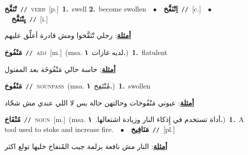 \documentclass[10pt,a4paper,twoside]{article} %
\begin{document}
\begin{multicols}{2}
{\setlength\topsep{0pt}\textbf{\foreignlanguage{arabic}{تْنَفَّخ}}\ {\color{gray}\texttt{//}\color{black}}\ \textsc{verb}\ [p.]\ \textbf{1.}~swell  \textbf{2.}~become swollen\ \ $\bullet$\ \ \setlength\topsep{0pt}\textbf{\foreignlanguage{arabic}{اِتْنَفَّخ}}\ {\color{gray}\texttt{//}\color{black}}\ [c.]\ \ $\bullet$\ \ \setlength\topsep{0pt}\textbf{\foreignlanguage{arabic}{يِتْنَفَّخ}}\ {\color{gray}\texttt{//}\color{black}}\ [i.]\  \begin{flushright}\color{gray}\foreignlanguage{arabic}{\textbf{\underline{\foreignlanguage{arabic}{أمثلة}}}: رجلي تْنَفَّخوا ومش قادرة أعلِّق عليهم}\end{flushright}\color{black}} \vspace{2mm}

{\setlength\topsep{0pt}\textbf{\foreignlanguage{arabic}{مَنْفُوخ}}\ {\color{gray}\texttt{//}\color{black}}\ \textsc{adj}\ [m.]\ \color{gray}(msa. \foreignlanguage{arabic}{لديه غازات}~\foreignlanguage{arabic}{\textbf{١.}})\color{black}\ \textbf{1.}~flatulent\  \begin{flushright}\color{gray}\foreignlanguage{arabic}{\textbf{\underline{\foreignlanguage{arabic}{أمثلة}}}: حاسة حالي مَنْفُوخَة بعد المفتول}\end{flushright}\color{black}} \vspace{2mm}

{\setlength\topsep{0pt}\textbf{\foreignlanguage{arabic}{مَنْفُوخ}}\ {\color{gray}\texttt{//}\color{black}}\ \textsc{noun\textunderscore pass}\ \color{gray}(msa. \foreignlanguage{arabic}{مُنْتَفِخ}~\foreignlanguage{arabic}{\textbf{١.}})\color{black}\ \textbf{1.}~swollen\  \begin{flushright}\color{gray}\foreignlanguage{arabic}{\textbf{\underline{\foreignlanguage{arabic}{أمثلة}}}: عيوني مَنْفُوخات وحالتهن حالة بس لا اللي عندي مش شحّاد}\end{flushright}\color{black}} \vspace{2mm}

{\setlength\topsep{0pt}\textbf{\foreignlanguage{arabic}{مُنْفَاخ}}\ {\color{gray}\texttt{//}\color{black}}\ \textsc{noun}\ [m.]\ \color{gray}(msa. \foreignlanguage{arabic}{أداة تستخدم في إِذكاء النار وزيادة اشتعالها.}~\foreignlanguage{arabic}{\textbf{١.}})\color{black}\ \textbf{1.}~A tool used to stoke and increase fire.\ \ $\bullet$\ \ \setlength\topsep{0pt}\textbf{\foreignlanguage{arabic}{مَنَافِيخ}}\ {\color{gray}\texttt{//}\color{black}}\ [pl.]\  \begin{flushright}\color{gray}\foreignlanguage{arabic}{\textbf{\underline{\foreignlanguage{arabic}{أمثلة}}}: النار مش نافعة بزلمة جيب المُنفاخ خليها تولع اكثر}\end{flushright}\color{black}} \vspace{2mm}


\end{multicols}
\end{document}
